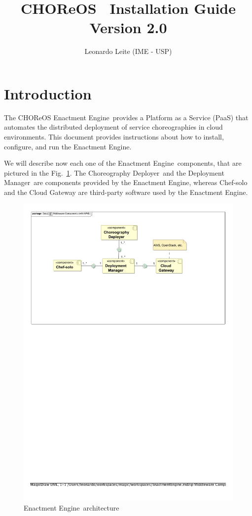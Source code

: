 \documentclass[a4paper, 10pt]{article}
\title{CHOReOS \ee\ Installation Guide \\ {\normalsize Version 2.0}}
\author{Leonardo Leite (IME - USP)}
\newcommand{\ee}{Enactment Engine}
\newcommand{\cd}{Choreography Deployer}
\newcommand{\dm}{Deployment Manager}
\begin{document}
\maketitle

\section{Introduction}

The CHOReOS \ee\ provides a Platform as a Service (PaaS) that automates the distributed deployment of service choreographies in cloud environments. This document provides instructions about how to install, configure, and run the \ee.

We will describe now each one of the \ee\ components, that are pictured in the Fig.~\ref{fig:ee_components}. The \cd\ and the \dm\ are components provided by the \ee, whereas Chef-solo and the Cloud Gateway are third-party software used by the \ee.

\begin{figure}
\centering
\includegraphics[scale=0.8]{img/components.pdf}
\caption{\ee\ architecture}
\label{fig:ee_components}
\end{figure}
\end{document}

